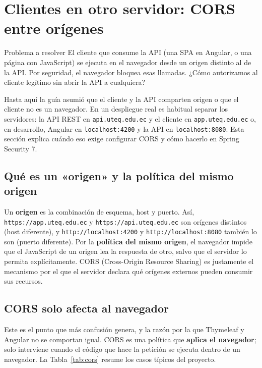 \documentclass[11pt]{article}
\begin{document}
\section{Clientes en otro servidor: CORS entre orígenes}
\begin{cajaproblema}{Problema a resolver}
El cliente que consume la API (una SPA en Angular, o una página con JavaScript) se ejecuta en el navegador desde un origen distinto al de la API. Por seguridad, el navegador bloquea esas llamadas. ¿Cómo autorizamos al cliente legítimo sin abrir la API a cualquiera?\par
\end{cajaproblema}
Hasta aquí la guía asumió que el cliente y la API comparten origen o que el cliente no es un navegador. En un despliegue real es habitual separar los servidores: la API REST en \texttt{api.uteq.edu.ec} y el cliente en \texttt{app.uteq.edu.ec} o, en desarrollo, Angular en \texttt{localhost:4200} y la API en \texttt{localhost:8080}. Esta sección explica cuándo eso exige configurar CORS y cómo hacerlo en Spring Security 7.

\subsection{Qué es un «origen» y la política del mismo origen}
Un \textbf{origen} es la combinación de esquema, host y puerto. Así, \texttt{https://\allowbreak{}app.uteq.edu.ec} y \texttt{https://\allowbreak{}api.uteq.edu.ec} son orígenes distintos (host diferente), y \texttt{http://\allowbreak{}localhost:4200} y \texttt{http://\allowbreak{}localhost:8080} también lo son (puerto diferente). Por la \textbf{política del mismo origen}, el navegador impide que el JavaScript de un origen lea la respuesta de otro, salvo que el servidor lo permita explícitamente. CORS (Cross-Origin Resource Sharing) es justamente el mecanismo por el que el servidor declara qué orígenes externos pueden consumir sus recursos.

\subsection{CORS solo afecta al navegador}
Este es el punto que más confusión genera, y la razón por la que Thymeleaf y Angular no se comportan igual. CORS es una política que \textbf{aplica el navegador}; solo interviene cuando el código que hace la petición se ejecuta dentro de un navegador. La Tabla~\ref{tab:cors} resume los casos típicos del proyecto.
\end{document}
